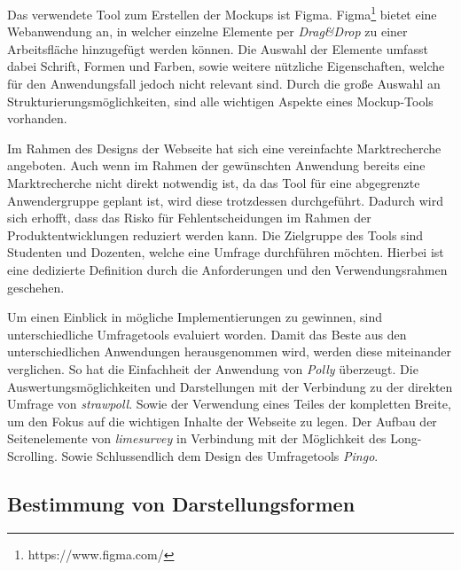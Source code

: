 Das verwendete Tool zum Erstellen der Mockups ist Figma.
Figma\footnote{https://www.figma.com/} bietet eine Webanwendung an, in welcher einzelne Elemente per \emph{Drag\&Drop} zu einer Arbeitsfläche hinzugefügt werden können. 
Die Auswahl der Elemente umfasst dabei Schrift, Formen und Farben, sowie weitere nützliche Eigenschaften, welche für den Anwendungsfall jedoch nicht relevant sind. 
Durch die große Auswahl an Strukturierungsmöglichkeiten, sind alle wichtigen Aspekte eines Mockup-Tools vorhanden.

Im Rahmen des Designs der Webseite hat sich eine vereinfachte Marktrecherche angeboten. 
Auch wenn im Rahmen der gewünschten Anwendung bereits eine Marktrecherche nicht direkt notwendig ist, da das Tool für eine abgegrenzte Anwendergruppe geplant ist, wird diese trotzdessen durchgeführt. 
Dadurch wird sich erhofft, dass das Risko für Fehlentscheidungen im Rahmen der Produktentwicklungen reduziert werden kann.\autocite{Pioch2019}
Die Zielgruppe des Tools sind Studenten und Dozenten, welche eine Umfrage durchführen möchten. 
Hierbei ist eine dedizierte Definition durch die Anforderungen und den Verwendungsrahmen geschehen. 

Um einen Einblick in mögliche Implementierungen zu gewinnen, sind unterschiedliche Umfragetools evaluiert worden. 
Damit das Beste aus den unterschiedlichen Anwendungen herausgenommen wird, werden diese miteinander verglichen.
So hat die Einfachheit der Anwendung von \emph{Polly} überzeugt.
Die Auswertungsmöglichkeiten und Darstellungen mit der Verbindung zu der direkten Umfrage von \emph{strawpoll}. 
Sowie der Verwendung eines Teiles der kompletten Breite, um den Fokus auf die wichtigen Inhalte der Webseite zu legen. 
Der Aufbau der Seitenelemente von \emph{limesurvey} in Verbindung mit der Möglichkeit des Long-Scrolling.
Sowie Schlussendlich dem Design des Umfragetools \emph{Pingo}.  

\subsection{Bestimmung von Darstellungsformen}